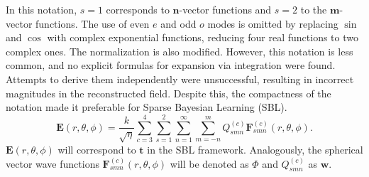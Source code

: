 \documentclass{article}
\begin{document}
In this notation, \(s=1\) corresponds to \(\mathbf{n}\)-vector functions and \(s=2\) to the \(\mathbf{m}\)-vector functions. The use of even \(e\) and odd \(o\) modes is omitted by replacing \(\sin\) and \(\cos\) with complex exponential functions, reducing four real functions to two complex ones. The normalization is also modified. However, this notation is less common, and no explicit formulas for expansion via integration were found. Attempts to derive them independently were unsuccessful, resulting in incorrect magnitudes in the reconstructed field. Despite this, the compactness of the notation made it preferable for Sparse Bayesian Learning (SBL).
\begin{equation}
    \label{eq:hansenEfield}
    \mathbf{E}(r,\theta,\phi) = \frac{k}{\sqrt{\eta}}\sum_{c=3}^4\sum_{s=1}^2 \sum_{n=1}^\infty \sum_{m=-n}^m Q_{smn}^{(c)} \mathbf{F}_{smn}^{(c)}(r,\theta,\phi).
\end{equation}
\(\mathbf{E}(r,\theta,\phi)\) will correspond to \(\mathbf{t}\) in the SBL framework. Analogously, the spherical vector wave functions \(\mathbf{F}_{smn}^{(c)}(r,\theta,\phi)\) will be denoted as \(\Phi\) and \(Q_{smn}^{(c)}\) as \(\mathbf{w}\).
\end{document}
